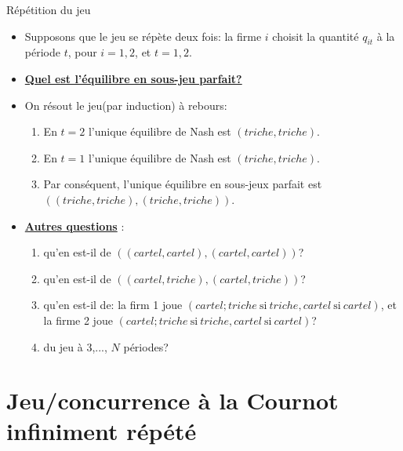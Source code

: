 \begin{frame}[allowframebreaks]{Répétition du jeu}
    \begin{itemize}
        \item Supposons que le jeu se répète deux fois: la firme $i$ choisit 
        la quantité $q_{it}$ à la période $t$, pour $i=1, 2$, et $t=1, 2$.
        \item \textbf{\underline{Quel est l'équilibre en sous-jeu parfait?}} 
        \item On résout le jeu(par induction) à rebours:
        \begin{enumerate}[-]
            \item En $t=2$ l'unique équilibre de Nash est $(triche, triche)$.
            \item En $t=1$ l'unique équilibre de Nash est $(triche, triche)$.
            \item Par conséquent, l'unique équilibre en sous-jeux parfait est $\left( 
                (triche, triche), (triche, triche)
            \right)$.
        \end{enumerate}
        \item \textbf{\underline{Autres questions}} : 
        \begin{enumerate}[-]
         \item qu'en est-il de $\left((cartel,cartel), (cartel,cartel)\right)$? 
         \item qu'en est-il de $\left((cartel, triche), (cartel, triche)\right)$?
         \item qu'en est-il de: la firm 1 joue $(cartel; triche \ \text{si} \ triche, cartel  \ \text{si} \ cartel)$,
          et la firme 2 joue $(cartel; triche \ \text{si} \ triche, cartel  \ \text{si} \ cartel)$?
        \item du jeu à 3,..., $N$ périodes?
\end{enumerate}
\end{itemize}
\end{frame}

\section{Jeu/concurrence à la Cournot infiniment répété}
\frame{\sectionpage}

